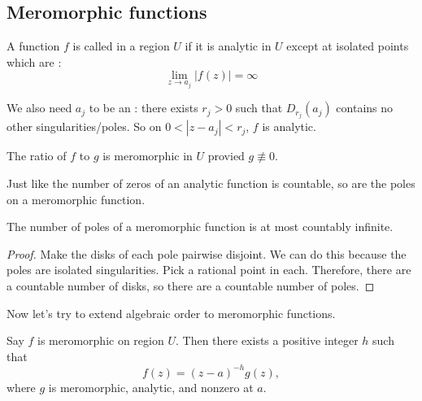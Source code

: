 \subsection{Meromorphic functions}

\begin{definition}
    A function $f$ is called  in a region
    $U$ if it is analytic in $U$ except at isolated points
    which are :
    \[ \lim_{z \to a_j} |f(z)| = \infty 
        \tag{for $a_j$ running over a countable index set $I$}
    \]

    We also need $a_j$ to be an :
    there exists $r_j>0$ such that $D_{r_j}(a_j)$
    contains no other singularities/poles.
    So on $0 < |z-a_j| < r_j$, $f$ is analytic.

\end{definition}

\begin{exercise}
    The ratio of $f$ to $g$ is meromorphic in $U$ provied
    $g \nequiv 0$.
\end{exercise}

Just like the number of zeros of an analytic function is countable,
so are the poles on a meromorphic function.

\begin{theorem}
    The number of poles of a meromorphic function
    is at most countably infinite.
\end{theorem}

\begin{proof}
    Make the disks of each pole pairwise disjoint.
    We can do this because the poles are isolated singularities.
    Pick a rational point in each.
    Therefore, there are a countable number of disks,
    so there are a countable number of poles.
\end{proof}

Now let's try to extend algebraic order to meromorphic 
functions.

\begin{theorem}
    Say $f$ is meromorphic on region $U$.
    Then there exists a positive integer $h$ such that
    \[ f(z) = (z-a)^{-h} g(z), \]
    where $g$ is meromorphic, analytic, and nonzero at $a$.
\end{theorem}

